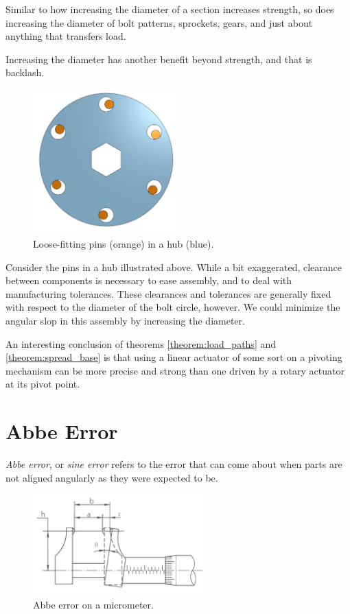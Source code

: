 Similar to how increasing the diameter of a section increases strength, so does increasing the diameter of bolt patterns, sprockets, gears, and just about anything that transfers load.

Increasing the diameter has another benefit beyond strength, and that is backlash.


\begin{figure}
	\includegraphics[width=0.5\textwidth]{imgs/hub_tolerance.png}
	\caption{Loose-fitting pins (orange) in a hub (blue).}
\end{figure}

Consider the pins in a hub illustrated above. While a bit exaggerated, clearance between components is necessary to ease assembly, and to deal with manufacturing tolerances. These clearances and tolerances are generally fixed with respect to the diameter of the bolt circle, however. We could minimize the angular slop in this assembly by increasing the diameter.

An interesting conclusion of theorems \ref{theorem:load_paths} and \ref{theorem:spread_base} is that using a linear actuator of some sort on a pivoting mechanism can be more precise and strong than one driven by a rotary actuator at its pivot point.

\section{Abbe Error}

\textit{Abbe error}, or \textit{sine error} refers to the error that can come about when parts are not aligned angularly as they were expected to be.

\begin{figure}[H]
	\includegraphics[width=0.6\textwidth]{imgs/abbe_error.png}
	\caption{Abbe error on a micrometer.}
\end{figure}

